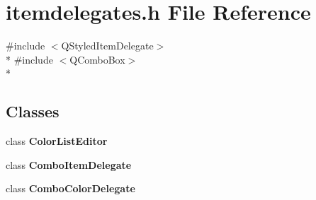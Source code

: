 \section{itemdelegates.\+h File Reference}
\label{itemdelegates_8h}
{\ttfamily \#include $<$Q\+Styled\+Item\+Delegate$>$}\\*
{\ttfamily \#include $<$Q\+Combo\+Box$>$}\\*
\subsection*{Classes}
\begin{DoxyCompactItemize}
\item 
class {\bf Color\+List\+Editor}
\item 
class {\bf Combo\+Item\+Delegate}
\item 
class {\bf Combo\+Color\+Delegate}
\end{DoxyCompactItemize}
